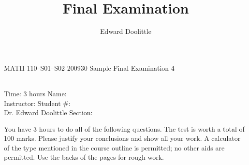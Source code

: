 \documentclass[12pt]{article}
\title{Final Examination}
\author{Edward Doolittle}
\begin{document}
\thispagestyle{plain}

\begin{center}
  \LARGE{MATH 110--S01--S02 200930 Sample Final Examination 4}
\end{center}

\begin{flushleft}
\quad\\
Time:  3 hours                  \hfill       Name: \underline{\hspace{2in}}  \\
Instructor:                     \hfill Student \#: \underline{\hspace{2in}}  \\
\quad Dr. Edward Doolittle  \hfill    Section: \underline{\hspace{2in}}  \\
\end{flushleft}


\noindent
You have 3 hours to do all of the following questions.
The test is worth a total of 100 marks.
Please justify your conclusions and
show all your work.
A calculator of the type mentioned in the course outline
is permitted; no other aids are permitted.
Use the backs of the pages for rough work.
\end{document}
